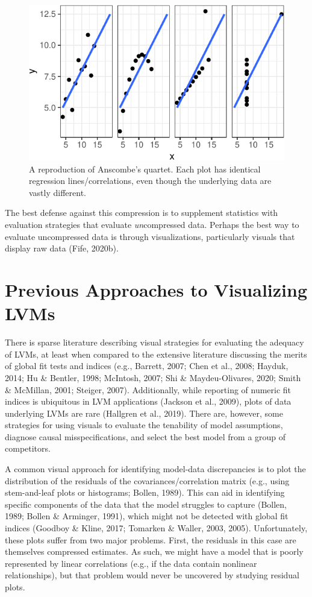 \documentclass[
  english,
  man]{apa6}
\begin{document}
\begin{figure}

{\centering \includegraphics[width=0.5\linewidth]{flexplavaan_draft_files/figure-latex/anscombe-1} 

}

\caption{A reproduction of Anscombe's quartet. Each plot has identical regression lines/correlations, even though the underlying data are vastly different.}\label{fig:anscombe}
\end{figure}

The best defense against this compression is to supplement statistics with evaluation strategies that evaluate \emph{un}compressed data. Perhaps the best way to evaluate uncompressed data is through visualizations, particularly visuals that display raw data (Fife, 2020b).

\hypertarget{previous-approaches-to-visualizing-lvms}{%
\section{Previous Approaches to Visualizing LVMs}\label{previous-approaches-to-visualizing-lvms}}

There is sparse literature describing visual strategies for evaluating the adequacy of LVMs, at least when compared to the extensive literature discussing the merits of global fit tests and indices (e.g., Barrett, 2007; Chen et al., 2008; Hayduk, 2014; Hu \& Bentler, 1998; McIntosh, 2007; Shi \& Maydeu-Olivares, 2020; Smith \& McMillan, 2001; Steiger, 2007). Additionally, while reporting of numeric fit indices is ubiquitous in LVM applications (Jackson et al., 2009), plots of data underlying LVMs are rare (Hallgren et al., 2019). There are, however, some strategies for using visuals to evaluate the tenability of model assumptions, diagnose causal misspecifications, and select the best model from a group of competitors.

A common visual approach for identifying model-data discrepancies is to plot the distribution of the residuals of the covariances/correlation matrix (e.g., using stem-and-leaf plots or histograms; Bollen, 1989). This can aid in identifying specific components of the data that the model struggles to capture (Bollen, 1989; Bollen \& Arminger, 1991), which might not be detected with global fit indices (Goodboy \& Kline, 2017; Tomarken \& Waller, 2003, 2005). Unfortunately, these plots suffer from two major problems. First, the residuals in this case are themselves compressed estimates. As such, we might have a model that is poorly represented by linear correlations (e.g., if the data contain nonlinear relationships), but that problem would never be uncovered by studying residual plots.
\end{document}
